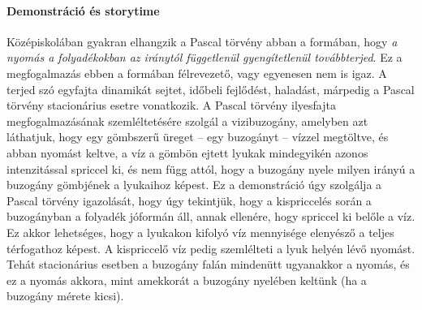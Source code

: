 \documentclass[12pt,a4paper]{scrartcl}
\begin{document}
\paragraph{Demonstráció és storytime}
Középiskolában gyakran elhangzik a Pascal törvény abban a formában, hogy \textit{a nyomás a folyadékokban az iránytól függetlenül gyengítetlenül továbbterjed}. Ez a megfogalmazás ebben a formában félrevezető, vagy egyenesen nem is igaz. A terjed szó egyfajta dinamikát sejtet, időbeli fejlődést, haladást, márpedig a Pascal törvény stacionárius esetre vonatkozik. A Pascal törvény ilyesfajta megfogalmazásának szemléltetésére szolgál a vizibuzogány, amelyben azt láthatjuk, hogy egy gömbszerű üreget -- egy buzogányt -- vízzel megtöltve, és abban nyomást keltve, a víz a gömbön ejtett lyukak mindegyikén azonos intenzitással spriccel ki, és nem függ attól, hogy a buzogány nyele milyen irányú a buzogány gömbjének a lyukaihoz képest. Ez a demonstráció úgy szolgálja a Pascal törvény igazolását, hogy úgy tekintjük, hogy a kispriccelés során a buzogányban a folyadék jóformán áll, annak ellenére, hogy spriccel ki belőle a víz. Ez akkor lehetséges, hogy a lyukakon kifolyó víz mennyisége elenyésző a teljes térfogathoz képest. A kispriccelő víz pedig szemlélteti a lyuk helyén lévő nyomást. Tehát stacionárius esetben a buzogány falán mindenütt ugyanakkor a nyomás, és ez a nyomás akkora, mint amekkorát a buzogány nyelében keltünk (ha a buzogány mérete kicsi).
\normalsize
\end{document}

